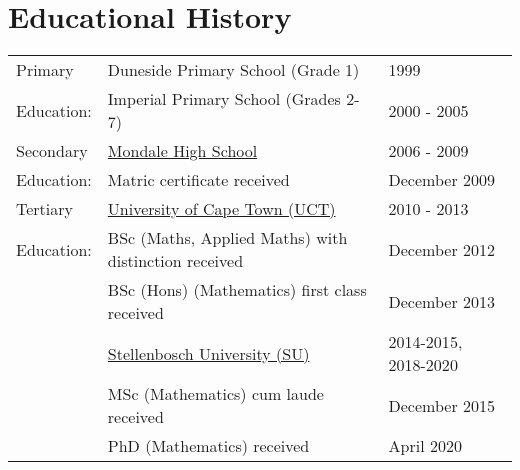 \documentclass{article}
\begin{document}
\section{Educational History}
\begin{center} \newcommand{\ind}{\hspace{0.4cm}} \begin{tabular}{lll}
	\toprule
	Primary			& Duneside Primary School (Grade 1)                           & 1999 \\
	Education:	& Imperial Primary School (Grades 2-7)                        & 2000 - 2005 \\
	\midrule
	Secondary		& \href{http://www.mondalehs.co.za/}{Mondale High School}     & 2006 - 2009 \\
	Education:	& \ind Matric certificate received                          	& \ind December 2009 \\
	\midrule
	Tertiary		& \href{http://www.uct.ac.za/}{University of Cape Town (UCT)} & 2010 - 2013 \\
	Education:	& \ind BSc (Maths, Applied Maths) with distinction received 	& \ind December 2012 \\
							& \ind BSc (Hons) (Mathematics) first class received        	& \ind December 2013 \\
							& \href{http://www.sun.ac.za/}{Stellenbosch University (SU)}  & 2014-2015, 2018-2020 \\
							& \ind MSc (Mathematics) cum laude received                 	& \ind December 2015 \\
							& \ind PhD (Mathematics) received															& \ind April 2020 \\
	\bottomrule
\end{tabular} \end{center}


\clearpage
\end{document}
